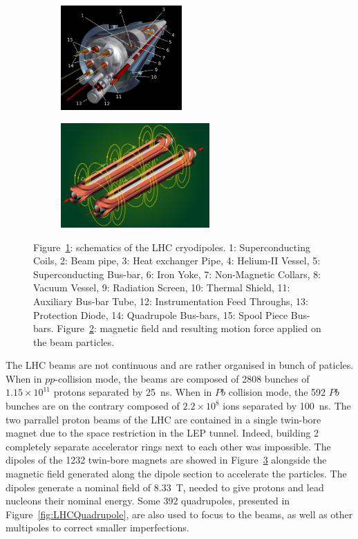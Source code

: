 	\begin{figure}[H]
		\begin{subfigure}{0.5\linewidth}
			\centering
			\includegraphics[height = 4cm]{fig/chapt2/LHC-dipole.png}
			\caption{\label{fig:LHCDipole:A}}
		\end{subfigure}
		\begin{subfigure}{0.5\linewidth}
			\centering
			\includegraphics[height = 4cm]{fig/chapt2/LHC-dipole-field.jpg}
			\caption{\label{fig:LHCDipole:B}}
		\end{subfigure}
		\caption{\label{fig:LHCDipole} Figure~\ref{fig:LHCDipole:A}: schematics of the LHC cryodipoles. 1: Superconducting Coils, 2: Beam pipe, 3: Heat exchanger Pipe, 4: Helium-II Vessel, 5: Superconducting Bus-bar, 6: Iron Yoke, 7: Non-Magnetic Collars, 8: Vacuum Vessel, 9: Radiation Screen, 10: Thermal Shield, 11: Auxiliary Bus-bar Tube, 12: Instrumentation Feed Throughs, 13: Protection Diode, 14: Quadrupole Bus-bars, 15: Spool Piece Bus-bars. Figure~\ref{fig:LHCDipole:B}: magnetic field and resulting motion force applied on the beam particles.}
	\end{figure}
	
	The LHC beams are not continuous and are rather organised in bunch of paticles. When in $pp$-collision mode, the beams are composed of 2808 bunches of $1.15 \times 10^{11}$ protons separated by \SI{25}{ns}. When in $Pb$ collision mode, the 592 $Pb$ bunches are on the contrary composed of $2.2 \times 10^8$ ions separated by \SI{100}{ns}. The two parrallel proton beams of the LHC are contained in a single twin-bore magnet due to the space restriction in the LEP tunnel. Indeed, building 2 completely separate accelerator rings next to each other was impossible. The dipoles of the 1232 twin-bore magnets are showed in Figure~\ref{fig:LHCDipole} alongside the magnetic field generated along the dipole section to accelerate the particles. The dipoles generate a nominal field of \SI{8.33}{T}, needed to give protons and lead nucleons their nominal energy. Some 392 quadrupoles, presented in Figure~\ref{fig:LHCQuadrupole}, are also used to focus to the beams, as well as other multipoles to correct smaller imperfections.
	
